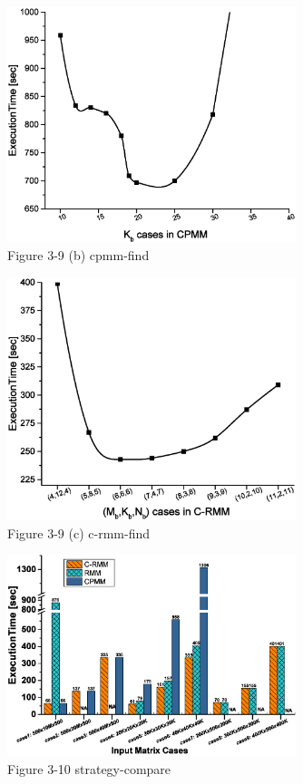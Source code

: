 \documentclass[onecolumn]{ieeetran}
\begin{document}
\begin{figure}[ht]
  \centering\captionsetup{justification=centering}
  \includegraphics[width=0.75\textwidth]{Figure_3-9_b_cpmm-find.eps}
  \caption{Figure 3-9 (b) cpmm-find}\label{cpmm-find}
\end{figure}


\begin{figure}[ht]
  \centering\captionsetup{justification=centering}
  \includegraphics[width=0.75\textwidth]{Figure_3-9_c_c-rmm-find.eps}
  \caption{Figure 3-9 (c) c-rmm-find}\label{c-rmm-find}
\end{figure}


\begin{figure}[ht]
  \centering
  \captionsetup{justification=centering}
  \includegraphics[width=0.75\textwidth]{Figure_3-10_strategy-compare.eps}
  \caption{Figure 3-10 strategy-compare}\label{Figure_3-10_strategy-compare}
\end{figure}
\end{document}
